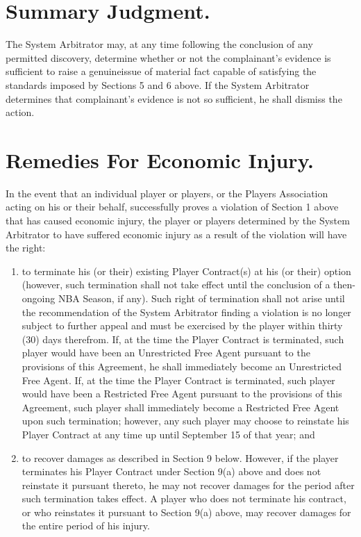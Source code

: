 \documentclass[
]{book}
\providecommand{\tightlist}{%
  \setlength{\itemsep}{0pt}\setlength{\parskip}{0pt}}
\begin{document}
\hypertarget{summary-judgment.}{%
\section{Summary Judgment.}\label{summary-judgment.}}

The System Arbitrator may, at any time following the conclusion of any permitted discovery, determine whether or not the complainant's evidence is sufficient to raise a genuineissue of material fact capable of satisfying the standards imposed by Sections 5 and 6 above. If the System Arbitrator determines that complainant's evidence is not so sufficient, he shall dismiss the action.

\hypertarget{remedies-for-economic-injury.}{%
\section{Remedies For Economic Injury.}\label{remedies-for-economic-injury.}}

In the event that an individual player or players, or the Players Association acting on his or their behalf, successfully proves a violation of Section 1 above that has caused economic injury, the player or players determined by the System Arbitrator to have suffered economic injury as a result of the violation will have the right:

\begin{enumerate}
\def\labelenumi{(\alph{enumi})}
\tightlist
\item
  to terminate his (or their) existing Player Contract(s) at his (or their) option (however, such termination shall not take effect until the conclusion of a then-ongoing NBA Season, if any). Such right of termination shall not arise until the recommendation of the System Arbitrator finding a violation is no longer subject to further appeal and must be exercised by the player within thirty (30) days therefrom. If, at the time the Player Contract is terminated, such player would have been an Unrestricted Free Agent pursuant to the provisions of this Agreement, he shall immediately become an Unrestricted Free Agent. If, at the time the Player Contract is terminated, such player would have been a Restricted Free Agent pursuant to the provisions of this Agreement, such player shall immediately become a Restricted Free Agent upon such termination; however, any such player may choose to reinstate his Player Contract at any time up until September 15 of that year; and
\item
  to recover damages as described in Section 9 below. However, if the player terminates his Player Contract under Section 9(a) above and does not reinstate it pursuant thereto, he may not recover damages for the period after such termination takes effect. A player who does not terminate his contract, or who reinstates it pursuant to Section 9(a) above, may recover damages for the entire period of his injury.
\end{enumerate}
\end{document}

